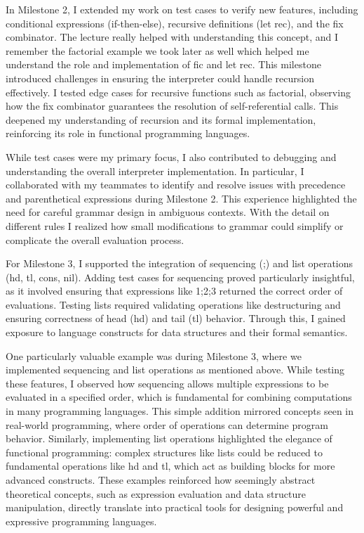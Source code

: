 \documentclass{article}
\theoremstyle{theorem}
\theoremstyle{definition}
\theoremstyle{remark}
\begin{document}
In Milestone 2, I extended my work on test cases to verify new features, including conditional expressions (if-then-else), recursive definitions (let rec), and the fix combinator. The lecture really helped with understanding this concept, and I remember the factorial example we took later as well which helped me understand the role and implementation of fic and let rec. This milestone introduced challenges in ensuring the interpreter could handle recursion effectively. I tested edge cases for recursive functions such as factorial, observing how the fix combinator guarantees the resolution of self-referential calls. This deepened my understanding of recursion and its formal implementation, reinforcing its role in functional programming languages.

While test cases were my primary focus, I also contributed to debugging and understanding the overall interpreter implementation. In particular, I collaborated with my teammates to identify and resolve issues with precedence and parenthetical expressions during Milestone 2. This experience highlighted the need for careful grammar design in ambiguous contexts. With the detail on different rules I realized how small modifications to grammar could simplify or complicate the overall evaluation process.

For Milestone 3, I supported the integration of sequencing (;) and list operations (hd, tl, cons, nil). Adding test cases for sequencing proved particularly insightful, as it involved ensuring that expressions like 1;2;3 returned the correct order of evaluations. Testing lists required validating operations like destructuring and ensuring correctness of head (hd) and tail (tl) behavior. Through this, I gained exposure to language constructs for data structures and their formal semantics.

One particularly valuable example was during Milestone 3, where we implemented sequencing and list operations as mentioned above. While testing these features, I observed how sequencing allows multiple expressions to be evaluated in a specified order, which is fundamental for combining computations in many programming languages. This simple addition mirrored concepts seen in real-world programming, where order of operations can determine program behavior. Similarly, implementing list operations highlighted the elegance of functional programming: complex structures like lists could be reduced to fundamental operations like hd and tl, which act as building blocks for more advanced constructs. These examples reinforced how seemingly abstract theoretical concepts, such as expression evaluation and data structure manipulation, directly translate into practical tools for designing powerful and expressive programming languages.
\end{document}
